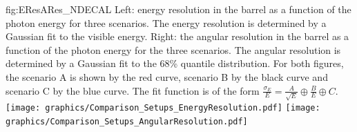 \begin{dunefigure}{fig:EResARes_NDECAL}
{Left: energy resolution in the barrel as a function of the photon energy for three  scenarios. The energy resolution is determined by a Gaussian fit to the visible energy. Right: the angular resolution in the barrel as a function of the photon energy for the three  scenarios. The angular resolution is determined by a Gaussian fit to the 68\% quantile distribution. For both figures, the scenario A is shown by the red curve, scenario B by the black curve and scenario C by the blue curve. The fit function is of the form $\frac{\sigma_{E}}{E} = \frac{A}{\sqrt{E}} \oplus \frac{B}{E} \oplus C$.}
\texttt{[image: graphics/Comparison\_Setups\_EnergyResolution.pdf]}
\texttt{[image: graphics/Comparison\_Setups\_AngularResolution.pdf]}
\end{dunefigure}



